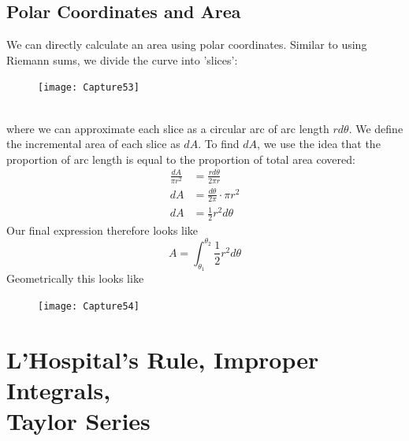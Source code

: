 \documentclass{report}
\begin{document}
\subsection{Polar Coordinates and Area} %
We can directly calculate an area using polar coordinates. Similar to using Riemann sums, we 
divide the curve into 'slices':
\begin{figure}[h]
\texttt{[image: Capture53]}\\
\centering
{}
\end{figure}\\
where we can approximate each slice as a circular arc of arc length $rd\theta$. We define the 
incremental area of each slice as $dA$. To find $dA$, we use the idea that the proportion
of arc length is equal to the proportion of total area covered:
\begin{align*}
\frac{dA}{\pi r^2}&=\frac{rd\theta}{2\pi r}\\
dA&=\frac{d\theta}{2\pi }\cdot\pi r^2\\
dA&=\frac{1}{2}r^2d\theta
\end{align*}
Our final expression therefore looks like
\begin{equation*}
A=\int_{\theta_1}^{\theta_2}\frac{1}{2}r^2d\theta
\end{equation*}
Geometrically this looks like
\begin{figure}[h]
\texttt{[image: Capture54]}\\
\centering
{}
\end{figure}
\newpage


\section{L'Hospital's Rule, Improper Integrals,\\ Taylor Series} %
\end{document}

